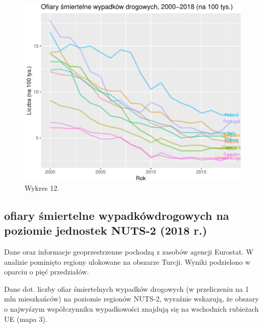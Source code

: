 \documentclass[
]{article}
\begin{document}
\begin{figure}

\includegraphics{raport_wypadki_files/figure-latex/unnamed-chunk-21-1} \hfill{}

\caption{Wykres 12.}\label{fig:unnamed-chunk-21}
\end{figure}

\hypertarget{ofiary-ux15bmiertelne-wypadkuxf3wdrogowych-na-poziomie-jednostek-nuts-2-2018-r.}{%
\subsection{ofiary śmiertelne wypadkówdrogowych na poziomie jednostek
NUTS-2 (2018
r.)}\label{ofiary-ux15bmiertelne-wypadkuxf3wdrogowych-na-poziomie-jednostek-nuts-2-2018-r.}}

Dane oraz informacje geoprzestrzenne pochodzą z zasobów agencji
Eurostat. W analizie pominięto regiony ulokowane na obszarze Turcji.
Wyniki podzielono w oparciu o pięć przedziałów.

Dane dot. liczby ofiar śmiertelnych wypadków drogowych (w przeliczeniu
na 1 mln mieszkańców) na poziomie regionów NUTS-2, wyraźnie wskazują, że
obszary o najwyśzym współczynniku wypadkowości znajdują się na
wschodnich rubieżach UE (mapa 3).
\end{document}
